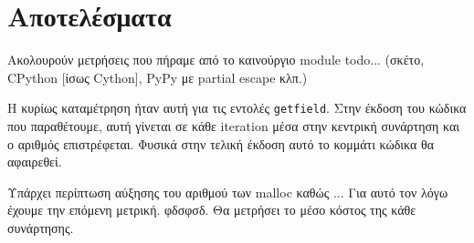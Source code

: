 
\chapter{Αποτελέσματα}
\label{chapter5}

Ακολουρούν μετρήσεις που πήραμε από το καινούργιο module todo...
(σκέτο, CPython [ίσως Cython], PyPy με partial escape κλπ.)

Η κυρίως καταμέτρηση ήταν αυτή για τις εντολές \texttt{getfield}. Στην έκδοση
του κώδικα που παραθέτουμε, αυτή γίνεται σε κάθε iteration μέσα στην κεντρική
συνάρτηση και ο αριθμός επιστρέφεται. Φυσικά στην τελική έκδοση αυτό το κομμάτι
κώδικα θα αφαιρεθεί.

Υπάρχει περίπτωση αύξησης του αριθμού των malloc καθώς ... Για αυτό τον λόγω
έχουμε την επόμενη μετρική. φδσφσδ. Θα μετρήσει το μέσο κόστος της κάθε
συνάρτησης.

